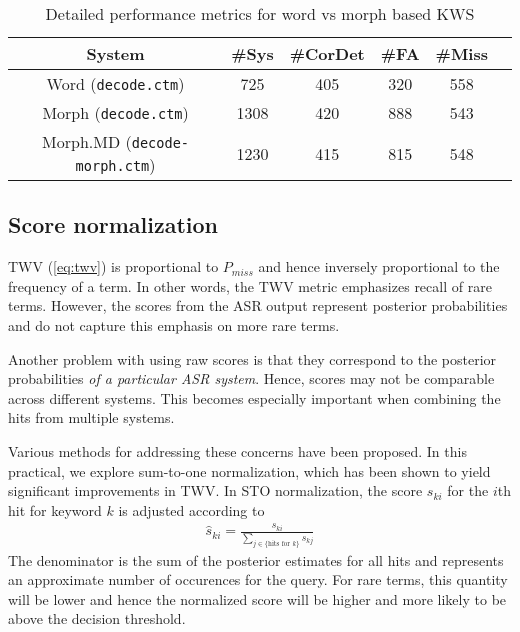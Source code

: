 \documentclass[a4paper,oneside,reqno]{amsart}
\begin{document}
\begin{table}
  \begin{tabular}{cccccc}
    \toprule
    System                            & \#Sys & \#CorDet & \#FA & \#Miss\\
    \midrule
    Word (\texttt{decode.ctm})        & 725   & 405      & 320  & 558\\
    Morph (\texttt{decode.ctm})       & 1308  & 420      & 888  & 543\\
    Morph.MD (\texttt{decode-morph.ctm}) & 1230  & 415      & 815  & 548\\
    \bottomrule
  \end{tabular}
  \caption{Detailed performance metrics for word vs morph based KWS}
  \label{tab:morph-word-perf}
\end{table}

\subsection{Score normalization}

TWV (\autoref{eq:twv}) is proportional to $P_{miss}$ and hence inversely
proportional to the frequency of a term. In other words, the TWV metric
emphasizes recall of rare terms\cite{mamou2013system}. However, the scores
from the ASR output represent posterior probabilities and do not capture
this emphasis on more rare terms.

Another problem with using raw scores is that they correspond to the posterior
probabilities \emph{of a particular ASR system}. Hence, scores may not be
comparable across different systems. This becomes especially important when
combining the hits from multiple systems\cite{mamou2013system}.

Various methods for addressing these concerns have been proposed. In this practical,
we explore sum-to-one normalization, which has been shown to yield significant
improvements in TWV\cite{gales2014speech}. In STO normalization, the score
$s_{ki}$ for the $i$th hit for keyword $k$ is adjusted according to
\begin{align}
  \label{eq:sto}
  \hat{s}_{ki} = \frac{s_{ki}}{\sum_{j \in \{\text{hits for $k$}\}} s_{kj}}
\end{align}
The denominator is the sum of the posterior estimates for all hits and represents
an approximate number of occurences for the query. For rare terms, this quantity
will be lower and hence the normalized score will be higher and more likely to be
above the decision threshold\cite{mamou2013system}.
\end{document}

